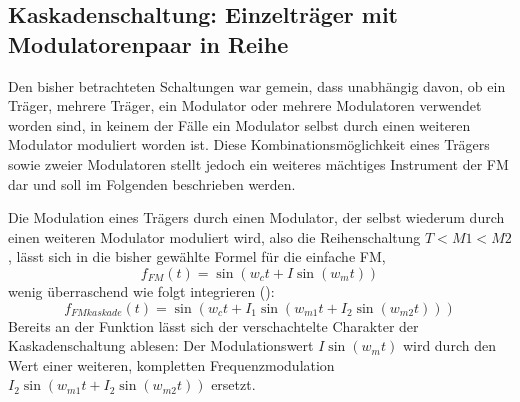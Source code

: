 \subsection{Kaskadenschaltung: Einzelträger mit Modulatorenpaar in Reihe}
\label{cascade}

Den bisher betrachteten Schaltungen war gemein, dass unabhängig davon, ob ein Träger, mehrere Träger, ein Modulator oder mehrere Modulatoren verwendet worden sind, in keinem der Fälle ein Modulator selbst durch einen weiteren Modulator moduliert worden ist. Diese Kombinationsmöglichkeit eines Trägers sowie zweier Modulatoren stellt jedoch ein weiteres mächtiges Instrument der FM dar und soll im Folgenden beschrieben werden. 

Die Modulation eines Trägers durch einen Modulator, der selbst wiederum durch einen weiteren Modulator moduliert wird, also die Reihenschaltung $T<M1<M2$, lässt sich in die bisher gewählte Formel für die einfache FM,
\begin{equation}\label{eq:fmsimplex}
f_{FM}(t) = \sin(w_ct + I\sin(w_mt))
\end{equation}
wenig überraschend wie folgt integrieren (\cite[S.48]{schottstaedt}):
\begin{equation}\label{eq:fmkaskade}
f_{FMkaskade}(t) = \sin(w_ct + I_1\sin(w_{m1}t + I_2\sin(w_{m2}t)))
\end{equation}
Bereits an der Funktion lässt sich der verschachtelte Charakter der Kaskadenschaltung ablesen: Der Modulationswert $ I\sin(w_mt) $ wird durch den Wert einer weiteren, kompletten Frequenzmodulation $ I_2\sin(w_{m1}t + I_2\sin(w_{m2}t)) $ ersetzt. 

